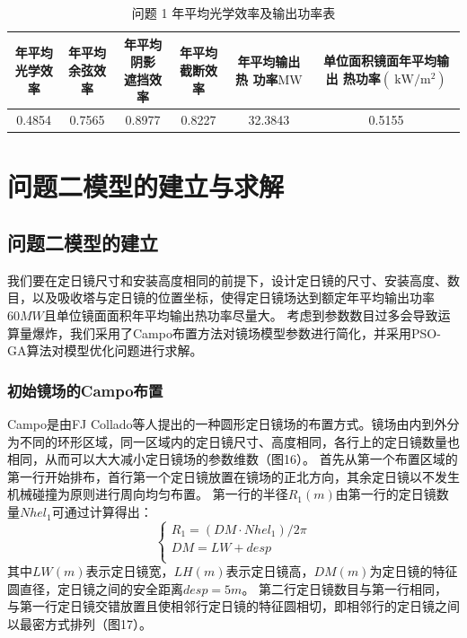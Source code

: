 \documentclass{article}
\numberwithin{equation}{subsection}
\begin{document}
\begin{table}[!htbp]
    \centering
    \begin{tabular}{|c|c|c|c|c|c|}\hline
        \makecell[c]{年平均\\光学效率}&\makecell[c]{年平均\\余弦效率}&\makecell[c]{年平均阴影\\遮挡效率}&\makecell[c]{年平均\\截断效率}&\makecell[c]{年平均输出热\\功率$\mathrm{MW}$}&\makecell[c]{单位面积镜面年平均输出\\热功率$(\mathrm{~kW} / \mathrm{m}^2)$}\\\hline
        0.4854& 	0.7565& 	0.8977& 	0.8227&32.3843 &0.5155 
        \\\hline
    \end{tabular}
    \caption{问题 1 年平均光学效率及输出功率表}
\end{table}


{\centering\section{问题二模型的建立与求解}}

\subsection{问题二模型的建立}
我们要在定日镜尺寸和安装高度相同的前提下，设计定日镜的尺寸、安装高度、数目，以及吸收塔与定日镜的位置坐标，使得定日镜场达到额定年平均输出功率$60MW$且单位镜面面积年平均输出热功率尽量大。
考虑到参数数目过多会导致运算量爆炸，我们采用了Campo布置方法\cite{7}对镜场模型参数进行简化，并采用PSO-GA算法对模型优化问题进行求解。

\subsubsection{初始镜场的Campo布置}
Campo是由FJ Collado等人\cite{7}提出的一种圆形定日镜场的布置方式。镜场由内到外分为不同的环形区域，同一区域内的定日镜尺寸、高度相同，各行上的定日镜数量也相同，从而可以大大减小定日镜场的参数维数（图16）。
首先从第一个布置区域的第一行开始排布，首行第一个定日镜放置在镜场的正北方向，其余定日镜以不发生机械碰撞为原则进行周向均匀布置。
第一行的半径$R_1(m)$由第一行的定日镜数量$Nhel_1$可通过计算得出：
\begin{equation}
    \left\{\begin{array}{l}
        R_1=(DM\cdot Nhel_1) / 2\pi\\
        DM=LW+desp\\
    \end{array}\right.
\end{equation}
其中$LW(m)$表示定日镜宽，$LH(m)$表示定日镜高，$DM(m)$为定日镜的特征圆直径，定日镜之间的安全距离$desp=5m$。
第二行定日镜数目与第一行相同，与第一行定日镜交错放置且使相邻行定日镜的特征圆相切，即相邻行的定日镜之间以最密方式排列（图17）。
\end{document}
